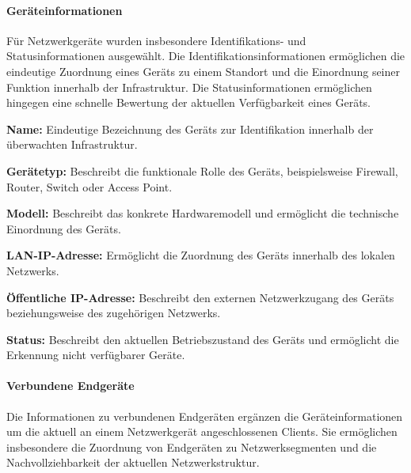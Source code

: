 \paragraph{Geräteinformationen}
\label{par:device-info}

Für Netzwerkgeräte wurden insbesondere Identifikations- und
Statusinformationen ausgewählt. Die Identifikationsinformationen
ermöglichen die eindeutige Zuordnung eines Geräts zu einem Standort
und die Einordnung seiner Funktion innerhalb der Infrastruktur. Die
Statusinformationen ermöglichen hingegen eine schnelle Bewertung der
aktuellen Verfügbarkeit eines Geräts.

\begin{compactitem}

    \item \textbf{Name:} Eindeutige Bezeichnung des Geräts zur
    Identifikation innerhalb der überwachten Infrastruktur.

    \item \textbf{Gerätetyp:} Beschreibt die funktionale Rolle des
    Geräts, beispielsweise Firewall, Router, Switch oder Access Point.

    \item \textbf{Modell:} Beschreibt das konkrete Hardwaremodell und
    ermöglicht die technische Einordnung des Geräts.

    \item \textbf{LAN-IP-Adresse:} Ermöglicht die Zuordnung des Geräts
    innerhalb des lokalen Netzwerks.

    \item \textbf{Öffentliche IP-Adresse:} Beschreibt den externen
    Netzwerkzugang des Geräts beziehungsweise des zugehörigen
    Netzwerks.

    \item \textbf{Status:} Beschreibt den aktuellen Betriebszustand
    des Geräts und ermöglicht die Erkennung nicht verfügbarer Geräte.

\end{compactitem}

\paragraph{Verbundene Endgeräte}

\label{par:device-clients}

Die Informationen zu verbundenen Endgeräten ergänzen die
Geräteinformationen um die aktuell an einem Netzwerkgerät
angeschlossenen Clients. Sie ermöglichen insbesondere die Zuordnung
von Endgeräten zu Netzwerksegmenten und die Nachvollziehbarkeit der
aktuellen Netzwerkstruktur.

